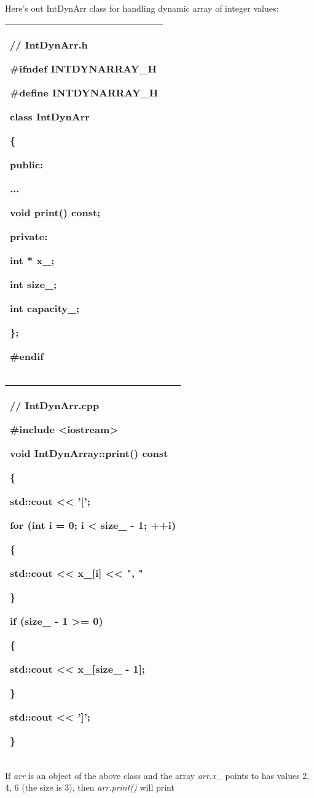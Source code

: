 \documentclass[
]{article}
\begin{document}
Here's out IntDynArr class for handling dynamic array of integer values:

\begin{longtable}[]{@{}l@{}}
\toprule
\endhead
\begin{minipage}[t]{0.97\columnwidth}\raggedright
// IntDynArr.h

\#ifndef INTDYNARRAY\_H

\#define INTDYNARRAY\_H

class IntDynArr

\{

public:

...

void print() const;

private:

int * x\_;

int size\_;

int capacity\_;

\};

\#endif\strut
\end{minipage}\tabularnewline
\bottomrule
\end{longtable}

\begin{longtable}[]{@{}l@{}}
\toprule
\endhead
\begin{minipage}[t]{0.97\columnwidth}\raggedright
// IntDynArr.cpp

\#include \textless iostream\textgreater{}

void IntDynArray::print() const

\{

std::cout \textless\textless{} '{[}';

for (int i = 0; i \textless{} size\_ - 1; ++i)

\{

std::cout \textless\textless{} x\_{[}i{]} \textless\textless{} ", "

\}

if (size\_ - 1 \textgreater= 0)

\{

std::cout \textless\textless{} x\_{[}size\_ - 1{]};

\}

std::cout \textless\textless{} '{]}';

\}\strut
\end{minipage}\tabularnewline
\bottomrule
\end{longtable}

If \emph{arr} is an object of the above class and the array
\emph{arr.x\_} points to has values 2, 4, 6 (the size is 3), then
\emph{arr.print()} will print
\end{document}
